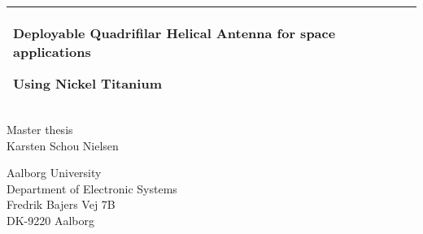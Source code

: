 %
%
%
%
%
\begin{titlepage}
  \addtolength{\hoffset}{0.5\evensidemargin-0.5\oddsidemargin} %
  \noindent%
  \begin{tabular}{@{}p{\textwidth}@{}}
    \toprule[2pt]
    \midrule
    \vspace{0.2cm}
    \begin{center}
    \Huge{\textbf{
      Deployable Quadrifilar Helical Antenna for space applications%
    }}
    \end{center}
    \begin{center}
      \Large{
        Using Nickel Titanium%
      }
    \end{center}
    \vspace{0.2cm}\\
    \midrule
    \toprule[2pt]
  \end{tabular}
  \vspace{4 cm}
  \begin{center}
    {\large
      Master thesis%
    }\\
    \vspace{0.2cm}
    {\Large
      Karsten Schou Nielsen%
    }
  \end{center}
  \vfill
  \begin{center}
  Aalborg University\\
  Department of Electronic Systems\\
  Fredrik Bajers Vej 7B\\
  DK-9220 Aalborg
  \end{center}
\end{titlepage}
\clearpage
